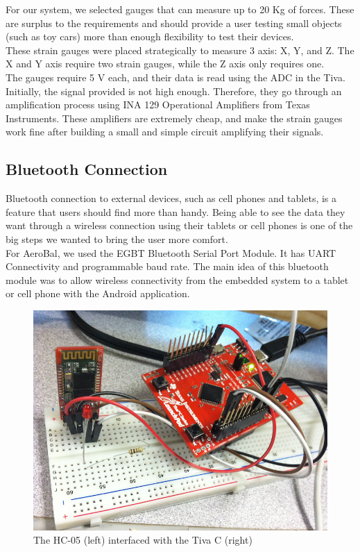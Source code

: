 		For our system, we selected gauges that can measure up to 20 Kg of forces. These are surplus to the requirements and should provide a user testing small objects (such as toy cars) more than enough flexibility to test their devices. \\
		
		These strain gauges were placed strategically to measure 3 axis: X, Y, and Z. The X and Y axis require two strain gauges, while the Z axis only requires one. \\
		
		The gauges require 5 V each, and their data is read using the ADC in the Tiva. Initially, the signal provided is not high enough. Therefore, they go through an amplification process using INA 129 Operational Amplifiers from Texas Instruments. These amplifiers are extremely cheap, and make the strain gauges work fine after building a small and simple circuit amplifying their signals.
		
		\subsection{Bluetooth Connection}
		
		Bluetooth connection to external devices, such as cell phones and tablets, is a feature that users should find more than handy. Being able to see the data they want through a wireless connection using their tablets or cell phones is one of the big steps we wanted to bring the user more comfort.  \\
		
		For AeroBal, we used the EGBT Bluetooth Serial Port Module. It has UART Connectivity and programmable baud rate. The main idea of this bluetooth module was to allow wireless connectivity from the embedded system to a tablet or cell phone with the Android application. 
		
		\begin{figure}[H]
			\centering
				\includegraphics[scale=0.35]{img/bluetoothModule}
			\caption{The HC-05 (left) interfaced with the Tiva C (right)}
		\end{figure}
		
